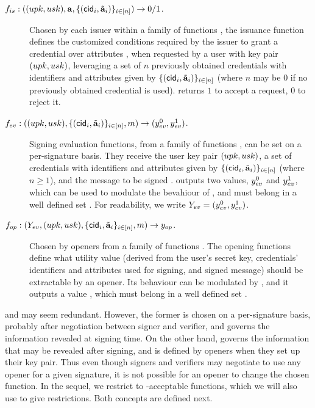 \begin{description}
\item[$f_{is}: ((upk,usk),\mathbf{a},\lbrace (\mathsf{cid}_i,\tilde{\mathbf{a}}_i)
  \rbrace_{i \in [n]}) \rightarrow 0/1$.] Chosen
  by each issuer within a family of functions \famfissue, the issuance function
  defines the customized conditions required by the issuer to grant a credential
  over attributes \attrs, when requested by a user with key pair $(upk,usk)$,
  leveraging a set of $n$ previously obtained credentials with identifiers and
  attributes given by $\lbrace (\mathsf{cid}_i,\tilde{\mathbf{a}}_i) \rbrace_{i \in [n]}$ (where $n$
  may be $0$ if no previously obtained credential is used). \fissue returns $1$
  to accept a request, $0$ to reject it.
\item[$f_{ev}: ((upk,usk),\lbrace(\mathsf{cid}_i,\tilde{\mathbf{a}}_i)\rbrace_{i \in [n]},m)
  \rightarrow (y_{ev}^0,y_{ev}^1)$.] Signing evaluation functions, from a
  family of functions \famfeval, can be set on a per-signature basis. They
  receive the user key pair $(upk,usk)$, a set of credentials with identifiers
  and attributes given by $\lbrace (\mathsf{cid}_i,\tilde{\mathbf{a}}_i) \rbrace_{i \in [n]}$
  (where $n \ge 1$), and the message to be signed \msg. \feval outputs two
  values, $y_{ev}^0$ and $y_{ev}^1$, which can be used to modulate the bevahiour
  of \finsp, and must belong in a well defined set \rngfeval. For readability,
  we write $Y_{ev} = (y_{ev}^0,y_{ev}^1)$.
\item[$f_{op}: (Y_{ev},(upk,usk),\lbrace \mathsf{cid}_i,\tilde{\mathbf{a}}_i\rbrace_{i \in [n]},
  m) \rightarrow y_{op}$.]
  Chosen by openers from a family of functions \famfinsp. The opening
  functions define what utility value (derived from the user's secret key,
  credentials' identifiers and attributes used for signing, and signed message)
  should be extractable by an opener. Its behaviour can be modulated by \Yeval,
  and it outputs a value \yinsp, which must belong in a well defined set
  \rngfinsp.
\end{description}

\feval and \finsp may seem redundant. However, the former is chosen on a
per-signature basis, probably after negotiation between signer and verifier, and
governs the information revealed at signing time. On the other hand, \finsp
governs the information that may be revealed after signing, and is defined by
openers when they set up their key pair. Thus even though signers and verifiers
may negotiate to use any opener for a given signature, it is not possible for
an opener to change the chosen function. In the sequel, we restrict to
\UAS-acceptable functions, which we will also use to give \CUASGen restrictions.
Both concepts are defined next.

